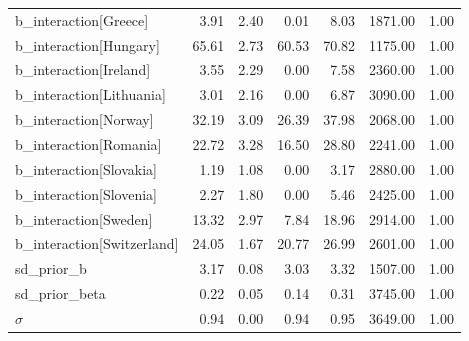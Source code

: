 \documentclass[a4paper,12pt]{article}
\begin{document}
\begin{table}[htbp]
\begin{tabular}{lrrrrrr}
b\_interaction[Greece] & 3.91 & 2.40 & 0.01 & 8.03 & 1871.00 & 1.00\\[0pt]
b\_interaction[Hungary] & 65.61 & 2.73 & 60.53 & 70.82 & 1175.00 & 1.00\\[0pt]
b\_interaction[Ireland] & 3.55 & 2.29 & 0.00 & 7.58 & 2360.00 & 1.00\\[0pt]
b\_interaction[Lithuania] & 3.01 & 2.16 & 0.00 & 6.87 & 3090.00 & 1.00\\[0pt]
b\_interaction[Norway] & 32.19 & 3.09 & 26.39 & 37.98 & 2068.00 & 1.00\\[0pt]
b\_interaction[Romania] & 22.72 & 3.28 & 16.50 & 28.80 & 2241.00 & 1.00\\[0pt]
b\_interaction[Slovakia] & 1.19 & 1.08 & 0.00 & 3.17 & 2880.00 & 1.00\\[0pt]
b\_interaction[Slovenia] & 2.27 & 1.80 & 0.00 & 5.46 & 2425.00 & 1.00\\[0pt]
b\_interaction[Sweden] & 13.32 & 2.97 & 7.84 & 18.96 & 2914.00 & 1.00\\[0pt]
b\_interaction[Switzerland] & 24.05 & 1.67 & 20.77 & 26.99 & 2601.00 & 1.00\\[0pt]
sd\_prior\_b & 3.17 & 0.08 & 3.03 & 3.32 & 1507.00 & 1.00\\[0pt]
sd\_prior\_beta & 0.22 & 0.05 & 0.14 & 0.31 & 3745.00 & 1.00\\[0pt]
\(\sigma\) & 0.94 & 0.00 & 0.94 & 0.95 & 3649.00 & 1.00\\[0pt]
\end{tabular}
\end{table}
\end{document}

